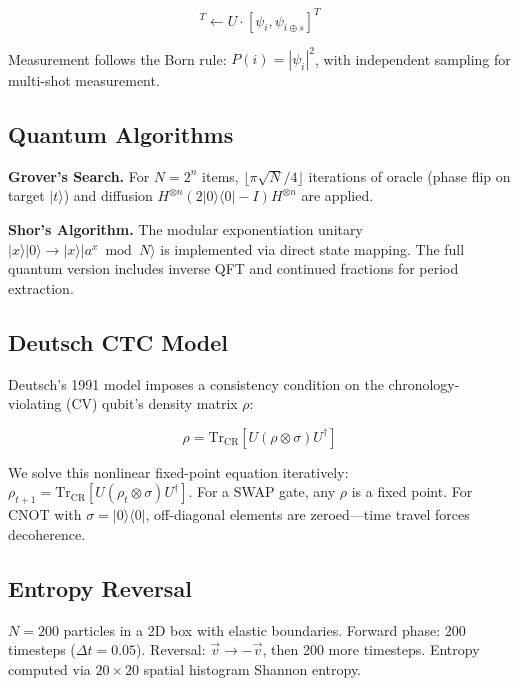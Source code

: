 \documentclass[12pt,a4paper]{article}
\begin{document}
\begin{equation}
[\psi_i, \psi_{i \oplus s}]^T \leftarrow U \cdot [\psi_i, \psi_{i \oplus s}]^T
\end{equation}

Measurement follows the Born rule: $P(i) = |\psi_i|^2$, with independent sampling for multi-shot measurement.

\subsection{Quantum Algorithms}

\textbf{Grover's Search.} For $N = 2^n$ items, $\lfloor \pi\sqrt{N}/4 \rfloor$ iterations of oracle (phase flip on target $|t\rangle$) and diffusion $H^{\otimes n}(2|0\rangle\langle 0| - I)H^{\otimes n}$ are applied.

\textbf{Shor's Algorithm.} The modular exponentiation unitary $|x\rangle|0\rangle \rightarrow |x\rangle|a^x \bmod N\rangle$ is implemented via direct state mapping. The full quantum version includes inverse QFT and continued fractions for period extraction.

\subsection{Deutsch CTC Model}

Deutsch's 1991 model \cite{deutsch1991} imposes a consistency condition on the chronology-violating (CV) qubit's density matrix $\rho$:

\begin{equation}
\rho = \text{Tr}_{\text{CR}}[U(\rho \otimes \sigma)U^\dagger]
\end{equation}

We solve this nonlinear fixed-point equation iteratively: $\rho_{t+1} = \text{Tr}_{\text{CR}}[U(\rho_t \otimes \sigma)U^\dagger]$. For a SWAP gate, any $\rho$ is a fixed point. For CNOT with $\sigma = |0\rangle\langle 0|$, off-diagonal elements are zeroed—time travel forces decoherence.

\subsection{Entropy Reversal}

$N = 200$ particles in a 2D box with elastic boundaries. Forward phase: 200 timesteps ($\Delta t = 0.05$). Reversal: $\vec{v} \rightarrow -\vec{v}$, then 200 more timesteps. Entropy computed via $20 \times 20$ spatial histogram Shannon entropy.
\end{document}
